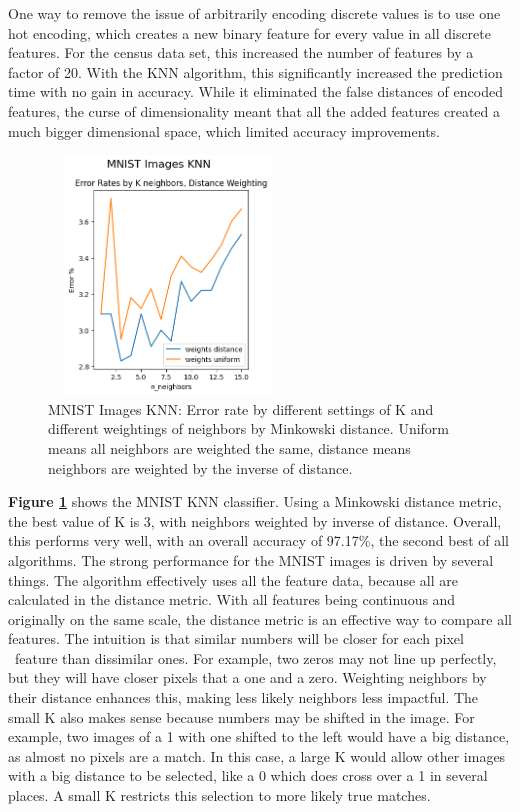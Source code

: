 \documentclass[letterpaper]{article} %
\begin{document}
One way to remove the issue of arbitrarily encoding discrete values is to use one hot encoding, which creates a new binary feature for every value in all discrete features.  For the census data set, this increased the number of features by a factor of 20. With the KNN algorithm, this significantly increased the prediction time with no gain in accuracy.  While it eliminated the false distances of encoded features, the curse of dimensionality meant that all the added features created a much bigger dimensional space, which limited accuracy improvements. 

\begin{figure}[h]
\centering
\includegraphics[width=2.5in, height=2.5in]{figures/MNIST_Images_KNN_knn_1.png}
\caption{MNIST Images KNN:  Error rate by different settings of K and different weightings of neighbors by Minkowski distance.  Uniform means all neighbors are weighted the same, distance means neighbors are weighted by the inverse of distance.  }
\label{fig:mnist_knn_1}
\end{figure}

\textbf{Figure \ref{fig:mnist_knn_1}} shows the MNIST KNN classifier.  Using a Minkowski distance metric, the best value of K is 3, with neighbors weighted by inverse of distance.  Overall, this performs very well, with an overall accuracy of 97.17\%, the second best of all algorithms.  The strong performance for the MNIST images is driven by several things.  The algorithm effectively uses all the feature data, because all are calculated in the distance metric.  With all features being continuous and originally on the same scale, the distance metric is an effective way to compare all features.  The intuition is that similar numbers will be closer for each pixel \ feature than dissimilar ones.  For example, two zeros may not line up perfectly, but they will have closer pixels that a one and a zero.  Weighting neighbors by their distance enhances this, making less likely neighbors less impactful.   The small K also makes sense because numbers may be shifted in the image. For example, two images of a 1 with one shifted to the left would have a big distance, as almost no pixels are a match.  In this case, a large K would allow other images with a big distance to be selected, like a 0 which does cross over a 1 in several places.  A small K restricts this selection to more likely true matches.
\end{document}

